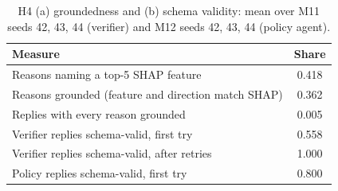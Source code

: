 \begin{table}[t]
\centering
\caption{H4 (a) groundedness and (b) schema validity: mean over M11 seeds 42, 43, 44 (verifier) and M12 seeds 42, 43, 44 (policy agent).}
\label{tab:explanations}
\begin{tabular}{lc}
\toprule
Measure & Share \\
\midrule
Reasons naming a top-5 SHAP feature & 0.418 \\
Reasons grounded (feature and direction match SHAP) & 0.362 \\
Replies with every reason grounded & 0.005 \\
Verifier replies schema-valid, first try & 0.558 \\
Verifier replies schema-valid, after retries & 1.000 \\
Policy replies schema-valid, first try & 0.800 \\
\bottomrule
\end{tabular}
\end{table}
